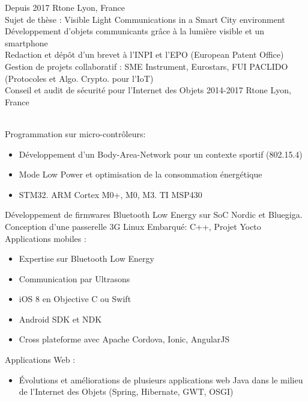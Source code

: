 \documentclass[]{cv-style}          %
\begin{document}
\begin{entrylist}
\entry
  {Depuis 2017}
  {Rtone}
  {Lyon, France}
  {\\
  Sujet de thèse : Visible Light Communications in a Smart City environment\\ 
  Développement d'objets communicants grâce à la lumière visible et un smartphone\\
  Redaction et dépôt d'un brevet à l'INPI et l'EPO (European Patent Office)\\
  Gestion de projets collaboratif : SME Instrument, Eurostars, FUI PACLIDO (Protocoles et Algo. Crypto. pour l'IoT)\\
  Conseil et audit de sécurité pour l'Internet des Objets
  }
\entry
  {2014-2017}
  {Rtone}
  {Lyon, France}
  {\\
  Programmation sur micro-contrôleurs:
  \begin{itemize}
    \item Développement d'un Body-Area-Network pour un contexte sportif (802.15.4)
    \item Mode Low Power et optimisation de la consommation énergétique
    \item STM32. ARM Cortex M0+, M0, M3. TI MSP430
  \end{itemize}
  Développement de firmwares Bluetooth Low Energy sur SoC Nordic et Bluegiga.\\
  Conception d'une passerelle 3G Linux Embarqué: C++, Projet Yocto\\
  Applications mobiles :
  \begin{itemize}
    \item Expertise sur Bluetooth Low Energy
    \item Communication par Ultrasons
    \item iOS 8 en Objective C ou Swift
    \item Android SDK et NDK
    \item Cross plateforme avec Apache Cordova, Ionic, AngularJS
  \end{itemize}
  Applications Web :
  \begin{itemize}
    \item Évolutions et améliorations de plusieurs applications web Java dans le milieu de l'Internet des Objets (Spring, Hibernate, GWT, OSGI)
  \end{itemize}}

\end{entrylist}
\end{document}
